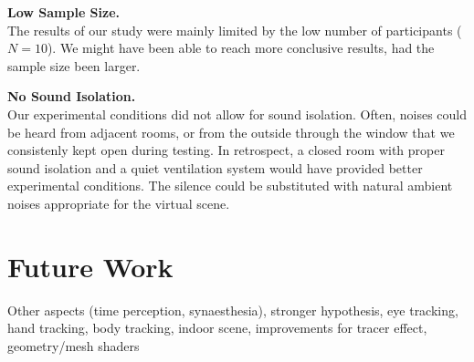 \textbf{Low Sample Size.}\\
The results of our study were mainly limited by the low number of participants ($N=10$). We might have been able to reach more conclusive results, had the sample size been larger.

\textbf{No Sound Isolation.}\\
Our experimental conditions did not allow for sound isolation. Often, noises could be heard from adjacent rooms, or from the outside through the window that we consistenly kept open during testing. In retrospect, a closed room with proper sound isolation and a quiet ventilation system would have provided better experimental conditions. The silence could be substituted with natural ambient noises appropriate for the virtual scene.

\section{Future Work}
Other aspects (time perception, synaesthesia), stronger hypothesis, eye tracking, hand tracking, body tracking, indoor scene, improvements for tracer effect, geometry/mesh shaders
